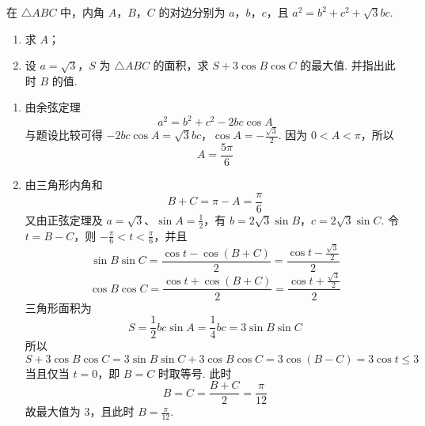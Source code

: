 \begin{problem}
在 \(\triangle ABC\) 中，内角 \(A\)，\(B\)，\(C\) 的对边分别为 \(a\)，\(b\)，\(c\)，且 \(a^2 = b^2 + c^2 + \sqrt{3}bc\).
\begin{enumerate}
\item 求 \(A\)；
\item 设 \(a = \sqrt{3}\)，\(S\) 为 \(\triangle ABC\) 的面积，求 \(S + 3\cos B\cos C\) 的最大值. 并指出此时 \(B\) 的值.
\end{enumerate}
\begin{solution}
\begin{enumerate}
\item 由余弦定理
\[
a^2=b^2+c^2-2bc\cos A
\]
与题设比较可得
\(-2bc\cos A=\sqrt3bc\)，\(\cos A=-\frac{\sqrt3}{2}\).
因为 \(0<A<\pi\)，所以
\[
A=\frac{5\pi}{6}
\]
\item 由三角形内角和
\[
B+C=\pi-A=\frac\pi6
\]
又由正弦定理及 \(a=\sqrt3\)、\(\sin A=\frac12\)，有
\(b=2\sqrt3\sin B\)，\(c=2\sqrt3\sin C\).
令 \(t=B-C\)，则 \(-\frac\pi6<t<\frac\pi6\)，并且
\[
\sin B\sin C=\frac{\cos t-\cos(B+C)}2
=\frac{\cos t-\frac{\sqrt3}{2}}2
\]
\[
\cos B\cos C=\frac{\cos t+\cos(B+C)}2
=\frac{\cos t+\frac{\sqrt3}{2}}2
\]
三角形面积为
\[
S=\frac12bc\sin A
=\frac14bc
=3\sin B\sin C
\]
所以
\[
S+3\cos B\cos C
=3\sin B\sin C+3\cos B\cos C
=3\cos(B-C)=3\cos t\leqslant3
\]
当且仅当 \(t=0\)，即 \(B=C\) 时取等号. 此时
\[
B=C=\frac{B+C}{2}=\frac\pi{12}
\]
故最大值为 \(3\)，且此时 \(B=\frac\pi{12}\).
\end{enumerate}
\end{solution}
\end{problem}

